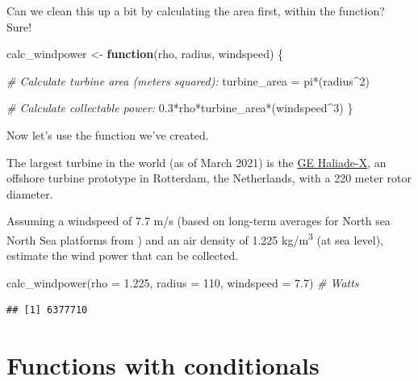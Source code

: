 \documentclass[
]{book}
\newenvironment{Shaded}{\begin{snugshade}}{\end{snugshade}}
\newcommand{\AttributeTok}[1]{\textcolor[rgb]{0.77,0.63,0.00}{#1}}
\newcommand{\CommentTok}[1]{\textcolor[rgb]{0.56,0.35,0.01}{\textit{#1}}}
\newcommand{\ControlFlowTok}[1]{\textcolor[rgb]{0.13,0.29,0.53}{\textbf{#1}}}
\newcommand{\DecValTok}[1]{\textcolor[rgb]{0.00,0.00,0.81}{#1}}
\newcommand{\FloatTok}[1]{\textcolor[rgb]{0.00,0.00,0.81}{#1}}
\newcommand{\FunctionTok}[1]{\textcolor[rgb]{0.00,0.00,0.00}{#1}}
\newcommand{\NormalTok}[1]{#1}
\newcommand{\OtherTok}[1]{\textcolor[rgb]{0.56,0.35,0.01}{#1}}
\newcommand{\SpecialCharTok}[1]{\textcolor[rgb]{0.00,0.00,0.00}{#1}}
\begin{document}
Can we clean this up a bit by calculating the area first, within the function? Sure!

\begin{Shaded}
\begin{Highlighting}[]
\NormalTok{calc\_windpower }\OtherTok{\textless{}{-}} \ControlFlowTok{function}\NormalTok{(rho, radius, windspeed) \{}
 
  \CommentTok{\# Calculate turbine area (meters squared):}
\NormalTok{  turbine\_area }\OtherTok{=}\NormalTok{ pi}\SpecialCharTok{*}\NormalTok{(radius}\SpecialCharTok{\^{}}\DecValTok{2}\NormalTok{)}
  
  \CommentTok{\# Calculate collectable power:}
  \FloatTok{0.3}\SpecialCharTok{*}\NormalTok{rho}\SpecialCharTok{*}\NormalTok{turbine\_area}\SpecialCharTok{*}\NormalTok{(windspeed}\SpecialCharTok{\^{}}\DecValTok{3}\NormalTok{)}
\NormalTok{\}}
\end{Highlighting}
\end{Shaded}

Now let's use the function we've created.

The largest turbine in the world (as of March 2021) is the \href{https://www.ge.com/renewableenergy/wind-energy/offshore-wind/haliade-x-offshore-turbine}{GE Haliade-X}, an offshore turbine prototype in Rotterdam, the Netherlands, with a 220 meter rotor diameter.

Assuming a windspeed of 7.7 m/s (based on long-term averages for North sea North Sea platforms from \citet{coelingh_analysis_1998}) and an air density of 1.225 kg/m\textsuperscript{3} (at sea level), estimate the wind power that can be collected.

\begin{Shaded}
\begin{Highlighting}[]
\FunctionTok{calc\_windpower}\NormalTok{(}\AttributeTok{rho =} \FloatTok{1.225}\NormalTok{, }\AttributeTok{radius =} \DecValTok{110}\NormalTok{, }\AttributeTok{windspeed =} \FloatTok{7.7}\NormalTok{) }\CommentTok{\# Watts}
\end{Highlighting}
\end{Shaded}

\begin{verbatim}
## [1] 6377710
\end{verbatim}

\hypertarget{functions-with-conditionals}{%
\section{Functions with conditionals}\label{functions-with-conditionals}}
\end{document}
